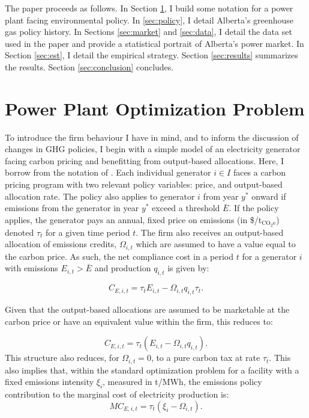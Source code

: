 \documentclass[12pt]{article}
\newcommand{\coe}{\text{CO$_2$e}}
\begin{document}
The paper proceeds as follows. In Section \ref{sec:opt}, I build some notation for a power plant facing environmental policy. In \ref{sec:policy}, I detail Alberta's greenhouse gas policy history. In Sections \ref{sec:market} and \ref{sec:data}, I detail the data set used in the paper and provide a statistical portrait of Alberta's power market. In Section \ref{sec:est}, I detail the empirical strategy. Section \ref{sec:results} summarizes the results. Section \ref{sec:conclusion} concludes.

\section{Power Plant Optimization Problem}\label{sec:opt}

To introduce the firm behaviour I have in mind, and to inform the discussion of changes in GHG policies, I begin with a simple model of an electricity generator facing carbon pricing and benefitting from output-based allocations. Here, I borrow from the notation of \cite{brown_carbon_2018}. Each individual generator $i \in I$ faces a carbon pricing program with two relevant policy variables: price, and output-based allocation rate. The policy also applies to generator $i$ from year $y^*$ onward if emissions from the generator in year $y^*$ exceed a threshold $\bar{E}$. If the policy applies, the generator pays an annual, fixed price on emissions (in \$/t$_{\text{CO}_2\text{e}}$) denoted $\tau_t$ for a given time period $t$. The firm also receives an output-based allocation of emissions credits, $\Omega_{i,t}$ which are assumed to have a value equal to the carbon price. As such, the net compliance cost in a period $t$ for a generator $i$ with emissions $E_{i,t}>\bar{E}$ and production $q_{i,t}$ is given by:

\begin{equation}
C_{E,i,t}=\tau_{t}E_{i,t}-\Omega_{i,t}q_{i,t}\tau_{t}.
\end{equation}

\noindent Given that the output-based allocations are assumed to be marketable at the carbon price or have an equivalent value within the firm, this reduces to:

\begin{equation}
C_{E,i,t}=\tau_{t}\left(E_{i,t}-\Omega_{i,t}q_{i,t}\right).
\end{equation}
\noindent This structure also reduces, for $\Omega_{i,t}=0$, to a pure carbon tax at rate $\tau_t$. This also implies that, within the standard optimization problem for a facility with a fixed emissions intensity $\xi_i$, measured in 
t\coe/MWh, the emissions policy contribution to the marginal cost of electricity production is:
\begin{equation}
MC_{E,i,t}=\tau_{t}\left(\xi_{i}-\Omega_{i,t}\right).
\end{equation}
\end{document}
